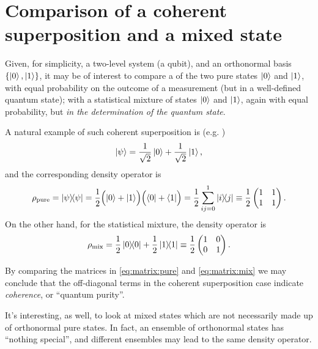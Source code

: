 \section{Comparison of a coherent superposition and a mixed state}
\label{sec:mix}

Given, for simplicity, a two-level system (a qubit), and an orthonormal basis
$\left\{\ket{0}, \ket{1}\right\}$, it may be of interest to compare a 
of the two pure states $\ket{0}$ and $\ket{1}$, with equal probability on the outcome of
a measurement (but in a well-defined quantum state); with a statistical mixture of
states $\ket{0}$ and $\ket{1}$, again with equal probability, but
\emph{in the determination of the quantum state}.

A natural example of such coherent superposition is (e.g. \cite[Example 2.4]{Nakahara})
\[
  \ket{\psi} = \frac{1}{\sqrt{2}}\ket{0} + \frac{1}{\sqrt{2}}\ket{1}\text{,}
\]
and the corresponding density operator is
\begin{multline}\label{eq:matrix:pure}
  \rho_{\mathrm{pure}} = \ketbra{\psi}{\psi} =
  \frac{1}{2}\qty\Big(\ket{0} + \ket{1}) \qty\Big(\bra{0} + \bra{1}) =
  \frac{1}{2}\sum_{ij=0}^1\ketbra{i}{j} \underset{}{\equiv}
  \frac{1}{2}
    \begin{pmatrix}
      1 &1  \\
      1 &1  \\
    \end{pmatrix}
  \text{.}
\end{multline}
On the other hand, for the statistical mixture, the density operator is
\begin{equation}\label{eq:matrix:mix}
  \rho_{\mathrm{mix}} = \frac{1}{2}\ketbra{0}{0} + \frac{1}{2}\ketbra{1}{1} \underset{}{\equiv}
  \frac{1}{2}
    \begin{pmatrix}
      1 &0  \\
      0 &1  \\
    \end{pmatrix}
  \text{.}
\end{equation}

By comparing the matrices in \eqref{eq:matrix:pure} and \eqref{eq:matrix:mix}
we may conclude that the off-diagonal terms in the coherent superposition case
indicate \emph{coherence}, or ``quantum purity''.

It's interesting, as well, to look at mixed states
which are not necessarily made up of orthonormal pure states.
In fact, an ensemble of orthonormal states has ``nothing special'',
and different ensembles may lead to the same density operator.

